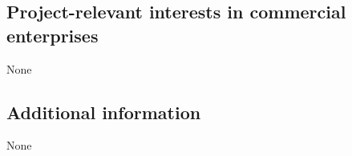 \documentclass[10pt,fleqn,twoside]{article}
\begin{document}
\subsection{Project-relevant interests in commercial enterprises}

None


\subsection{Additional information}

None
\end{document}
